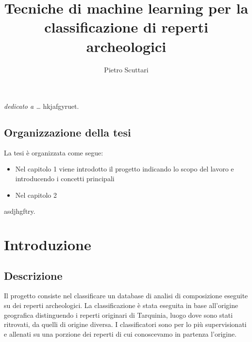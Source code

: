 \documentclass[a4paper,12pt]{report}
\begin{document}
\title{Tecniche di machine learning per la classificazione di reperti archeologici}
\author{Pietro Scuttari}
%
% 
%
\beforepreface
\prefacesection{}
		{\hfill \Large {\sl dedicato a \dots}}
% 
%
hkjafgyruet.
%
%
\section{Organizzazione della tesi}
\label{organizzazione}
La tesi \`e organizzata come segue:
\begin{itemize}
	\item Nel capitolo 1 viene introdotto il progetto indicando lo scopo del lavoro e 
introducendo i concetti principali
	\item Nel capitolo 2 

\end{itemize}
%
%
asdjhgftry.
\afterpreface
% 
% 
\chapter{Introduzione}
\label{cap1}
\section{Descrizione}
Il progetto consiste nel classificare un database di analisi di composizione eseguite
su dei reperti archeologici. La classificazione è stata eseguita in base all'origine
geografica distinguendo i reperti originari di Tarquinia, luogo dove sono stati 
ritrovati, da quelli di origine diversa. I classificatori sono per lo più 
supervisionati e allenati su una porzione dei reperti di cui conoscevamo in partenza
l'origine.
\end{document}

